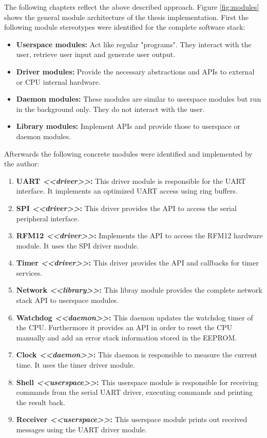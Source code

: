 The following chapters reflect the above described approach. Figure \ref{fig:modules} shows the general module architecture of the thesis implementation. First the following module stereotypes were identified for the complete software stack:

\begin{itemize}
    \item \textbf{Userspace modules:} Act like regular "programs". They interact with the user, retrieve user input and generate user output.
    \item \textbf{Driver modules:} Provide the necessary abstractions and APIs to external or CPU internal hardware.
    \item \textbf{Daemon modules:} These modules are similar to userspace modules but run in the background only. They do not interact with the user.
    \item \textbf{Library modules:} Implement APIs and provide those to userspace or daemon modules.
\end{itemize}

Afterwards the following concrete modules were identified and implemented by the author:

\begin{enumerate}
    \item \textbf{UART \emph{<<driver>>}:} This driver module is responsible for the UART interface. It implements an optimized UART access using ring buffers.
    \item \textbf{SPI \emph{<<driver>>}:} This driver provides the API to access the serial peripheral interface.
    \item \textbf{RFM12 \emph{<<driver>>}:} Implements the API to access the RFM12 hardware module. It uses the SPI driver module.
    \item \textbf{Timer \emph{<<driver>>}:} This driver provides the API and callbacks for timer services.
    \item \textbf{Network \emph{<<library>>}:} This libray module provides the complete network stack API to userspace modules.
    \item \textbf{Watchdog \emph{<<daemon>>}:} This daemon updates the watchdog timer of the CPU. Furthermore it provides an API in order to reset the CPU manually and add an error stack information stored in the EEPROM.
    \item \textbf{Clock \emph{<<daemon>>}:} This daemon is responsible to measure the current time. It uses the timer driver module.
    \item \textbf{Shell \emph{<<userspace>>}:} This userspace module is responsible for receiving commands from the serial UART driver, executing commands and printing the result back.
    \item \textbf{Receiver \emph{<<userspace>>}:} This userspace module prints out received messages using the UART driver module.
\end{enumerate}

